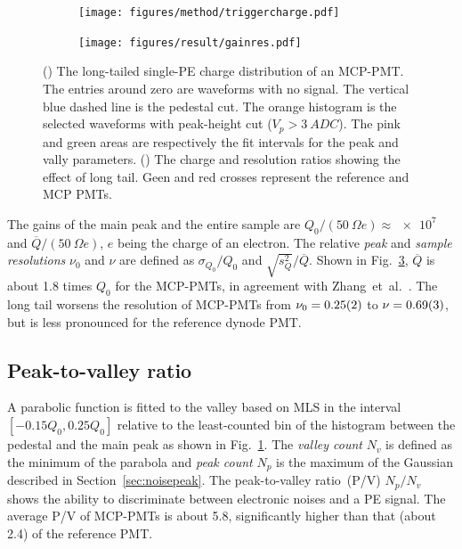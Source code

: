 \begin{figure}[!htbp]
    \centering
    \begin{subfigure}[b]{\SF\textwidth}
        \texttt{[image: figures/method/triggercharge.pdf]}
        \caption{}%
        \label{fig:triggercharge}
    \end{subfigure}
    \begin{subfigure}[b]{\SF\textwidth}
        \texttt{[image: figures/result/gainres.pdf]}
        \caption{}
        \label{fig:totalchargeCompare}
    \end{subfigure}
    \caption{() The long-tailed single-PE charge distribution of an MCP-PMT. The entries around zero are waveforms with no signal. The vertical blue dashed line is the pedestal cut. The orange histogram is the selected waveforms with peak-height cut ($V_p>\SI{3}{ADC}$). The pink and green areas are respectively the fit intervals for the peak and vally parameters. () The charge and resolution ratios showing the effect of long tail. Geen and red crosses represent the reference and MCP PMTs.
    }
\end{figure}

The gains of the main peak and the entire sample are ${Q_0}/({\SI{50}{\Omega}} e) \approx \num{e7}$ and ${\overline{Q}}/(\SI{50}{\Omega} e)$, $e$ being the charge of an electron. The relative \emph{peak} and \emph{sample resolutions} $\nu_0$ and $\nu$ are defined as ${\sigma_{Q_0}}/{Q_0}$ and ${\sqrt{s^2_{Q}}}/{\overline{Q}}$.  Shown in Fig.~\ref{fig:totalchargeCompare}, $\overline{Q}$ is about 1.8 times $Q_0$ for the MCP-PMTs, in agreement with Zhang~et~al.~\cite{JUNOLongtail}. The long tail worsens the resolution of MCP-PMTs from $\nu_0=\num{0.25 \pm 0.02}$ to $\nu=\num{0.69 \pm 0.03}$, but is less pronounced for the reference dynode PMT.

\subsection{Peak-to-valley ratio}
A parabolic function is fitted to the valley based on MLS in the interval $[-0.15Q_0, 0.25Q_0]$ relative to the least-counted bin of the histogram between the pedestal and the main peak as shown in Fig.~\ref{fig:triggercharge}. The \emph{valley count} $N_v$ is defined as the minimum of the parabola and \emph{peak count} $N_p$ is the maximum of the Gaussian described in Section~\ref{sec:noisepeak}. The peak-to-valley ratio~(P/V) ${N_p}/{N_v}$ shows the ability to discriminate between electronic noises and a PE signal. The average P/V of MCP-PMTs is about 5.8, significantly higher than that (about 2.4) of the reference PMT.

